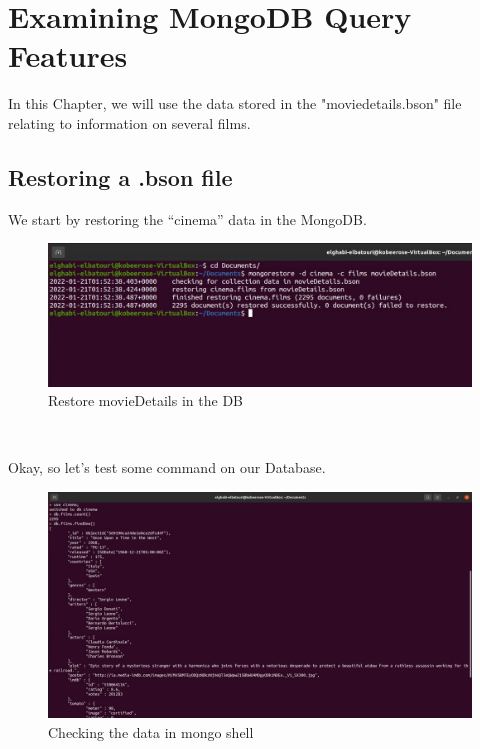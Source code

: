 \chapter{Examining MongoDB Query Features}
\par In this Chapter, we will use the data stored in the "moviedetails.bson" file relating to
information on several films.

\begin{spacing}{0.9}
\section{Restoring a .bson file }
\par We start by restoring the “cinema” data in the MongoDB.
\begin{figure}[!htb] 
\begin{center} 
\includegraphics[width=.93\linewidth]{Pictures/MongoDB/Examining MongoDB Query Features/Restoring a .bson file/Restore movieDetails in the DB} 
\end{center} 
\caption{Restore movieDetails in the DB} 
\end{figure}  \FloatBarrier
\\
\par Okay, so let's test some command on our Database.
\begin{figure}[!htb] 
\begin{center} 
\includegraphics[width=.93\linewidth]{Pictures/MongoDB/Examining MongoDB Query Features/Restoring a .bson file/Checking the data in mongo shell} 
\end{center} 
\caption{Checking the data in mongo shell} 
\end{figure}  \FloatBarrier
\\

\end{spacing}
